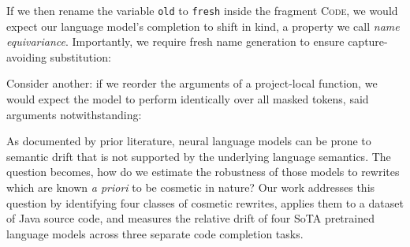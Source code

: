 \documentclass[usenames,dvipsnames]{article} %
\begin{document}
  If we then rename the variable \texttt{old} to \texttt{fresh} inside the fragment \textsc{Code}, we would expect our language model's completion to shift in kind, a property we call \textit{name equivariance}. Importantly, we require fresh name generation to ensure capture-avoiding substitution:

  \begin{center}
    \begin{prooftree}
    \end{prooftree}
  \end{center}

  Consider another: if we reorder the arguments of a project-local function, we would expect the model to perform identically over all masked tokens, said arguments notwithstanding:

  \begin{center}
    \begin{prooftree}
    \end{prooftree}
  \end{center}

As documented by prior literature, neural language models can be prone to semantic drift that is not supported by the underlying language semantics. The question becomes, how do we estimate the robustness of those models to rewrites which are known \textit{a priori} to be cosmetic in nature? Our work addresses this question by identifying four classes of cosmetic rewrites, applies them to a dataset of Java source code, and measures the relative drift of four SoTA pretrained language models across three separate code completion tasks.

\end{document}
